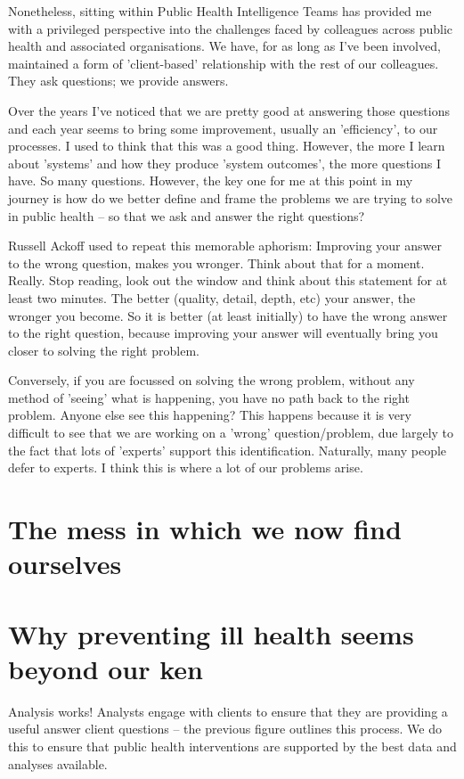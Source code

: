 Nonetheless, sitting within Public Health Intelligence Teams has provided me with a privileged perspective into the challenges faced by colleagues across public health and associated organisations. We have, for as long as I've been involved, maintained a form of 'client-based' relationship with the rest of our colleagues. They ask questions; we provide answers.

Over the years I've noticed that we are pretty good at answering those questions and each year seems to bring some improvement, usually an 'efficiency', to our processes. I used to think that this was a good thing. However, the more I learn about 'systems' and how they produce 'system outcomes', the more questions I have. So many questions. However, the key one for me at this point in my journey is how do we better define and frame the problems we are trying to solve in public health -- so that we ask and answer the right questions?

Russell Ackoff used to repeat this memorable aphorism: Improving your answer to the wrong question, makes you wronger. Think about that for a moment. Really. Stop reading, look out the window and think about this statement for at least two minutes. The better (quality, detail, depth, etc) your answer, the wronger you become. So it is better (at least initially) to have the wrong answer to the right question, because improving your answer will eventually bring you closer to solving the right problem. 

Conversely, if you are focussed on solving the wrong problem, without any method of 'seeing' what is happening, you have no path back to the right problem. Anyone else see this happening? This happens because it is very difficult to see that we are working on a 'wrong' question/problem, due largely to the fact that lots of 'experts' support this identification. Naturally, many people defer to experts. I think this is where a lot of our problems arise.

\section{The mess in which we now find ourselves}

\section*{Why preventing ill health seems beyond our ken}
Analysis works! Analysts engage with clients to ensure that they are providing a useful answer client questions -- the previous figure outlines this process. We do this to ensure that public health interventions are supported by the best data and analyses available.


